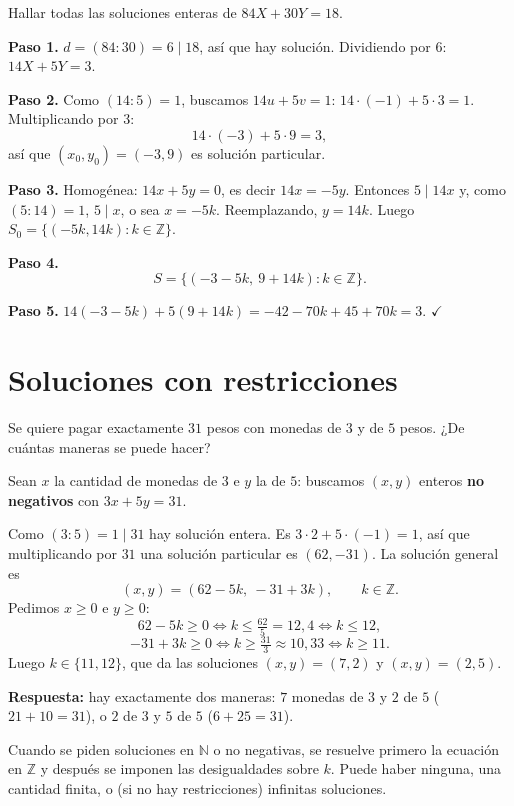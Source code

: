 \begin{ejemplo}
Hallar todas las soluciones enteras de $84X+30Y=18$.

\textbf{Paso 1.} $d=(84:30)=6\mid 18$, así que hay solución. Dividiendo por $6$:
$14X+5Y=3$.

\textbf{Paso 2.} Como $(14:5)=1$, buscamos $14u+5v=1$: $14\cdot(-1)+5\cdot 3=1$.
Multiplicando por $3$:
\[
14\cdot(-3)+5\cdot 9=3,
\]
así que $(x_0,y_0)=(-3,9)$ es solución particular.

\textbf{Paso 3.} Homogénea: $14x+5y=0$, es decir $14x=-5y$. Entonces $5\mid 14x$ y,
como $(5:14)=1$, $5\mid x$, o sea $x=-5k$. Reemplazando, $y=14k$. Luego
$S_0=\{(-5k,14k) : k\in\mathbb{Z}\}$.

\textbf{Paso 4.}
\[
S=\{(-3-5k,\ 9+14k) : k\in\mathbb{Z}\}.
\]

\textbf{Paso 5.} $14(-3-5k)+5(9+14k)=-42-70k+45+70k=3$. $\checkmark$
\end{ejemplo}

\section{Soluciones con restricciones}

\begin{ejemplo}
Se quiere pagar exactamente $31$ pesos con monedas de $3$ y de $5$ pesos. ¿De
cuántas maneras se puede hacer?

Sean $x$ la cantidad de monedas de $3$ e $y$ la de $5$: buscamos $(x,y)$ enteros
\textbf{no negativos} con $3x+5y=31$.

Como $(3:5)=1\mid 31$ hay solución entera. Es $3\cdot 2+5\cdot(-1)=1$, así que
multiplicando por $31$ una solución particular es $(62,-31)$. La solución general
es
\[
(x,y)=(62-5k,\ -31+3k), \qquad k\in\mathbb{Z}.
\]
Pedimos $x\ge 0$ e $y\ge 0$:
\[
62-5k\ge 0 \iff k\le \tfrac{62}{5}=12{,}4 \iff k\le 12,
\]
\[
-31+3k\ge 0 \iff k\ge \tfrac{31}{3}\approx 10{,}33 \iff k\ge 11.
\]
Luego $k\in\{11,12\}$, que da las soluciones $(x,y)=(7,2)$ y $(x,y)=(2,5)$.

\textbf{Respuesta:} hay exactamente dos maneras: $7$ monedas de $3$ y $2$ de $5$
($21+10=31$), o $2$ de $3$ y $5$ de $5$ ($6+25=31$).
\end{ejemplo}

\begin{nota}
Cuando se piden soluciones en $\mathbb{N}$ o no negativas, se resuelve primero la
ecuación en $\mathbb{Z}$ y después se imponen las desigualdades sobre $k$. Puede
haber ninguna, una cantidad finita, o (si no hay restricciones) infinitas
soluciones.
\end{nota}